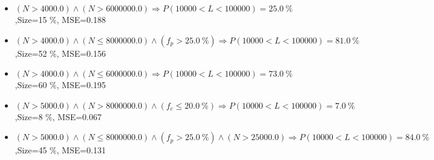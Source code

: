 \documentclass[numbered]{CSL}
\begin{document}
\begin{itemize}
\item $(N > 4000.0) \land (N > 6000000.0) \Rightarrow P(10 000 < L < 100 000) = 25.0~\%$,\hfill Size=15 \%, MSE=0.188
\item $(N > 4000.0) \land (N \leq 8000000.0) \land (f_p > 25.0~\%) \Rightarrow P(10 000 < L < 100 000) = 81.0~\%$,\hfill Size=52 \%, MSE=0.156
\item $(N > 4000.0) \land (N \leq 6000000.0) \Rightarrow P(10 000 < L < 100 000) = 73.0~\%$,\hfill Size=60 \%, MSE=0.195
\item $(N > 5000.0) \land (N > 8000000.0) \land (f_c \leq 20.0~\%) \Rightarrow P(10 000 < L < 100 000) = 7.0~\%$,\hfill Size=8 \%, MSE=0.067
\item $(N > 5000.0) \land (N \leq 8000000.0) \land (f_p > 25.0~\%) \land (N > 25000.0) \Rightarrow P(10 000 < L < 100 000) = 84.0~\%$,\hfill Size=45 \%, MSE=0.131
\end{itemize}
\end{document}
